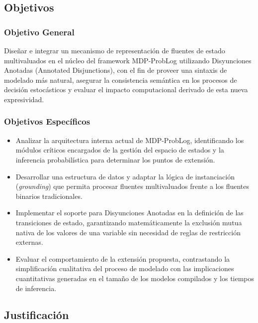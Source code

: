 \subsection{Objetivos}
\label{sec:objetivos}

\subsubsection{Objetivo General}
\label{subsec:objetivo_general}

Diseñar e integrar un mecanismo de representación de fluentes de estado multivaluados en el núcleo del framework MDP-ProbLog utilizando Disyunciones Anotadas (Annotated Disjunctions), con el fin de proveer una sintaxis de modelado más natural, asegurar la consistencia semántica en los procesos de decisión estocásticos y evaluar el impacto computacional derivado de esta nueva expresividad.

\subsubsection{Objetivos Específicos}
\label{subsec:objetivos_especificos}

\begin{itemize}
    \item Analizar la arquitectura interna actual de MDP-ProbLog, identificando los módulos críticos encargados de la gestión del espacio de estados y la inferencia probabilística para determinar los puntos de extensión.
    \item Desarrollar una estructura de datos y adaptar la lógica de instanciación (\textit{grounding}) que permita procesar fluentes multivaluados frente a los fluentes binarios tradicionales.
    \item Implementar el soporte para Disyunciones Anotadas en la definición de las transiciones de estado, garantizando matemáticamente la exclusión mutua nativa de los valores de una variable sin necesidad de reglas de restricción externas.
    \item Evaluar el comportamiento de la extensión propuesta, contrastando la simplificación cualitativa del proceso de modelado con las implicaciones cuantitativas generadas en el tamaño de los modelos compilados y los tiempos de inferencia.
\end{itemize}

\clearpage

\subsection{Justificación}
\label{sec:justificacion}

